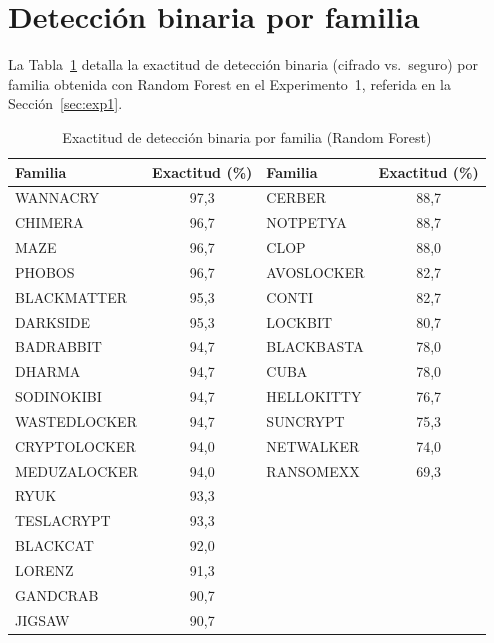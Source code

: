 
\section{Detección binaria por familia}
\label{apx:binaria_familia}

La Tabla~\ref{tab:apx_binaria_familia} detalla la exactitud de detección binaria (cifrado vs.\ seguro) por familia obtenida con Random Forest en el Experimento~1, referida en la Sección~\ref{sec:exp1}.

\begin{table}[ht]
\centering
\caption{Exactitud de detección binaria por familia (Random Forest)}
\label{tab:apx_binaria_familia}
\begin{tabular}{|l|c||l|c|}
\hline
\textbf{Familia} & \textbf{Exactitud (\%)} & \textbf{Familia} & \textbf{Exactitud (\%)} \\ \hline
WANNACRY & 97,3 & CERBER & 88,7 \\ \hline
CHIMERA & 96,7 & NOTPETYA & 88,7 \\ \hline
MAZE & 96,7 & CLOP & 88,0 \\ \hline
PHOBOS & 96,7 & AVOSLOCKER & 82,7 \\ \hline
BLACKMATTER & 95,3 & CONTI & 82,7 \\ \hline
DARKSIDE & 95,3 & LOCKBIT & 80,7 \\ \hline
BADRABBIT & 94,7 & BLACKBASTA & 78,0 \\ \hline
DHARMA & 94,7 & CUBA & 78,0 \\ \hline
SODINOKIBI & 94,7 & HELLOKITTY & 76,7 \\ \hline
WASTEDLOCKER & 94,7 & SUNCRYPT & 75,3 \\ \hline
CRYPTOLOCKER & 94,0 & NETWALKER & 74,0 \\ \hline
MEDUZALOCKER & 94,0 & RANSOMEXX & 69,3 \\ \hline
RYUK & 93,3 & & \\ \hline
TESLACRYPT & 93,3 & & \\ \hline
BLACKCAT & 92,0 & & \\ \hline
LORENZ & 91,3 & & \\ \hline
GANDCRAB & 90,7 & & \\ \hline
JIGSAW & 90,7 & & \\ \hline
\end{tabular}
\end{table}


